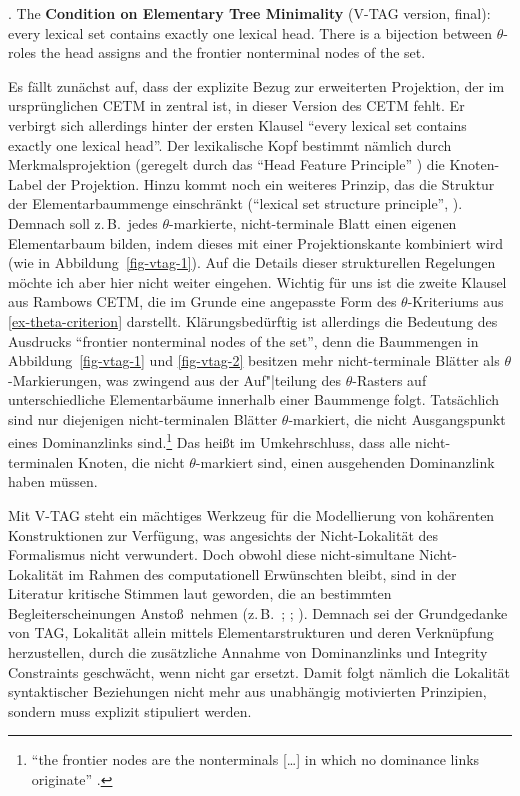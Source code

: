 \ex. The {\bf Condition on Elementary Tree Minimality} (V-TAG version, final): every lexical set contains exactly one lexical head. There is a bijection between $\theta$-roles the head assigns and the frontier nonterminal nodes of the set. \citep[149]{Rambow:94} \label{ex-vtag-cetm6}

Es fällt zunächst auf, dass der explizite Bezug zur erweiterten Projektion, der im ursprünglichen CETM in \cite{Frank:92,Frank:02} zentral ist, in dieser Version des CETM fehlt. Er verbirgt sich allerdings hinter der ersten Klausel "`every lexical set contains exactly one lexical head"'. Der lexikalische Kopf bestimmt nämlich durch Merkmalsprojektion (geregelt durch das "`Head Feature Principle"' \citealt[141f]{Rambow:94}) die Knoten-Label der Projektion. Hinzu kommt noch ein weiteres Prinzip, das die Struktur der Elementarbaummenge einschränkt ("`lexical set structure principle"', \citealt[149]{Rambow:94}). Demnach soll z.\,B.\ jedes $\theta$-markierte, nicht-terminale Blatt einen eigenen Elementarbaum bilden, indem dieses mit einer Projektionskante kombiniert wird (wie in Abbildung~\ref{fig-vtag-1}). Auf die Details dieser strukturellen Regelungen möchte ich aber hier nicht weiter eingehen. Wichtig für uns ist die zweite Klausel aus Rambows CETM, die im Grunde eine angepasste Form des $\theta$-Kriteriums aus \ref{ex-theta-criterion} darstellt. Klärungsbedürftig ist allerdings die Bedeutung des Ausdrucks "`frontier nonterminal nodes of the set"', denn die Baummengen in Abbildung~\ref{fig-vtag-1} und \ref{fig-vtag-2} besitzen mehr nicht-terminale Blätter als $\theta$-Markierungen, was zwingend aus der Auf"|teilung des $\theta$-Rasters auf unterschiedliche Elementarbäume innerhalb einer Baummenge folgt. Tatsächlich sind nur diejenigen nicht-terminalen Blätter $\theta$-markiert, die nicht Ausgangspunkt eines Dominanzlinks sind.\footnote{"`the frontier nodes are the nonterminals [\ldots] in which no dominance links originate"' \citep[148, Fußnote~14]{Rambow:94}.} Das hei\ss t im Umkehrschluss, dass alle nicht-terminalen Knoten, die nicht $\theta$-markiert sind, einen ausgehenden Dominanzlink haben müssen.  

Mit V-TAG steht ein mächtiges Werkzeug für die Modellierung von kohärenten Konstruktionen zur Verfügung, was angesichts der Nicht-Lokalität des Formalismus nicht verwundert. Doch obwohl diese nicht-simultane Nicht-Lokalität im Rahmen des computationell Erwünschten bleibt, sind in der Literatur kritische Stimmen laut geworden, die an bestimmten Begleiterscheinungen Ansto\ss \ nehmen (z.\,B.\ \citealt[60]{Kulick:00}; \citealt[239]{Frank:02}; \citealt[191]{Kallmeyer:05}). Demnach sei der Grundgedanke von TAG, Lokalität allein mittels Elementarstrukturen und deren Verknüpfung herzustellen, durch die zusätzliche Annahme von Dominanzlinks und Integrity Constraints geschwächt, wenn nicht gar ersetzt. Damit folgt nämlich die Lokalität syntaktischer Beziehungen nicht mehr aus unabhängig motivierten Prinzipien, sondern muss explizit stipuliert werden.


